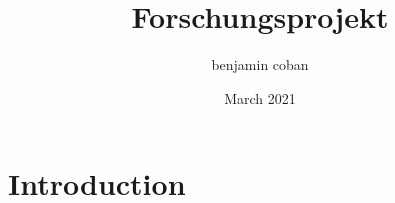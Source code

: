 \documentclass{article}
\title{Forschungsprojekt}
\author{benjamin coban}
\date{March 2021}
\begin{document}
\maketitle

\section{Introduction}
\end{document}
